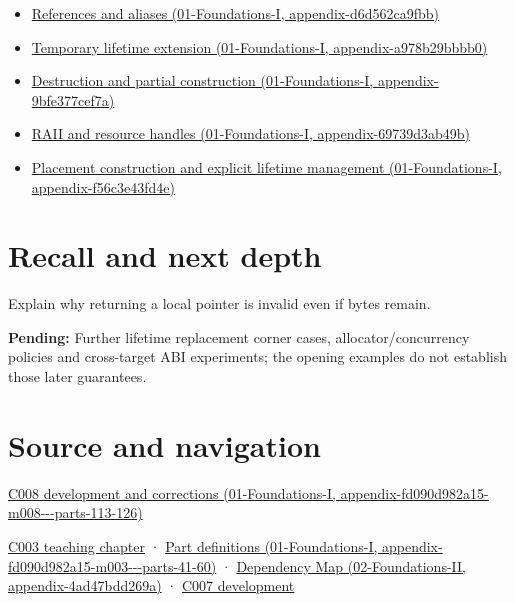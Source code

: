 \begin{itemize}
\item
  \href{../01-Foundations-I/main.pdf\#nameddest=appendix-d6d562ca9fbb}{References and aliases (01-Foundations-I, appendix-d6d562ca9fbb)}
\item
  \href{../01-Foundations-I/main.pdf\#nameddest=appendix-a978b29bbbb0}{Temporary lifetime extension (01-Foundations-I, appendix-a978b29bbbb0)}
\item
  \href{../01-Foundations-I/main.pdf\#nameddest=appendix-9bfe377cef7a}{Destruction and partial construction (01-Foundations-I, appendix-9bfe377cef7a)}
\item
  \href{../01-Foundations-I/main.pdf\#nameddest=appendix-69739d3ab49b}{RAII and resource handles (01-Foundations-I, appendix-69739d3ab49b)}
\item
  \href{../01-Foundations-I/main.pdf\#nameddest=appendix-f56c3e43fd4e}{Placement construction and explicit lifetime management (01-Foundations-I, appendix-f56c3e43fd4e)}
\end{itemize}

\section{Recall and next depth}\label{appendix-0b104bcba06b-recall-and-next-depth}

Explain why returning a local pointer is invalid even if bytes remain.

\textbf{Pending:} Further lifetime replacement corner cases, allocator/concurrency policies and cross-target ABI experiments; the opening examples do not establish those later guarantees.

\section{Source and navigation}\label{appendix-0b104bcba06b-source-and-navigation}

\href{../01-Foundations-I/main.pdf\#nameddest=appendix-fd090d982a15-m008---parts-113-126}{C008 development and corrections (01-Foundations-I, appendix-fd090d982a15-m008-\/-\/-parts-113-126)}

\href{Continuous\%20Notes/Computing\%20Foundations\%20-\%20From\%20Bits\%20to\%20C++\%20and\%20Systems\%20APIs\#Where\%20the\%20bytes\%20live}{C003 teaching chapter} · \href{../01-Foundations-I/main.pdf\#nameddest=appendix-fd090d982a15-m003---parts-41-60}{Part definitions (01-Foundations-I, appendix-fd090d982a15-m003-\/-\/-parts-41-60)} · \href{../02-Foundations-II/main.pdf\#nameddest=appendix-4ad47bdd269a}{Dependency Map (02-Foundations-II, appendix-4ad47bdd269a)} · \href{Continuous\%20Notes/Computing\%20Foundations\%20-\%20From\%20Bits\%20to\%20C++\%20and\%20Systems\%20APIs\#Storage\%20is\%20a\%20place;\%20an\%20object\%20is\%20its\%20occupant}{C007 development}
